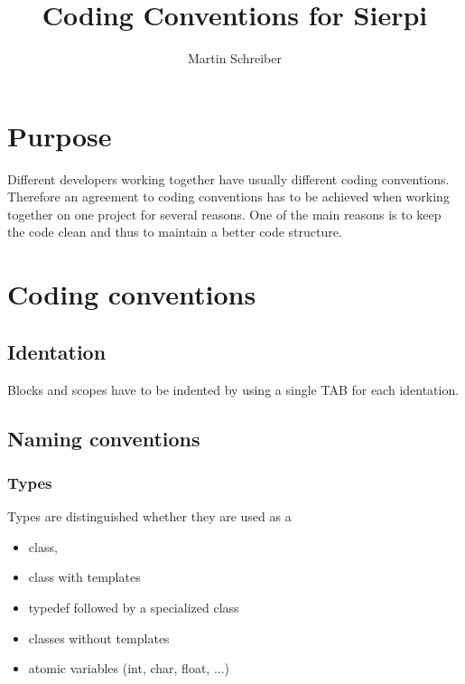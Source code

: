 \documentclass[10pt,a4paper]{article}
\author{Martin Schreiber}
\title{Coding Conventions for Sierpi}
\begin{document}
\maketitle

\section{Purpose}
Different developers working together have usually different coding conventions.
Therefore an agreement to coding conventions has to be achieved when working together on one project for several reasons.
One of the main reasons is to keep the code clean and thus to maintain a better code structure.


\section{Coding conventions}

\subsection{Identation}
Blocks and scopes have to be indented by using a single TAB for each identation.

\subsection{Naming conventions}

\subsubsection{Types}

Types are distinguished whether they are used as a
\begin{itemize}
	\item class,
	\item class with templates
	\item typedef followed by a specialized class
	\item classes without templates
	\item atomic variables (int, char, float, ...)
\end{itemize}


\end{document}
